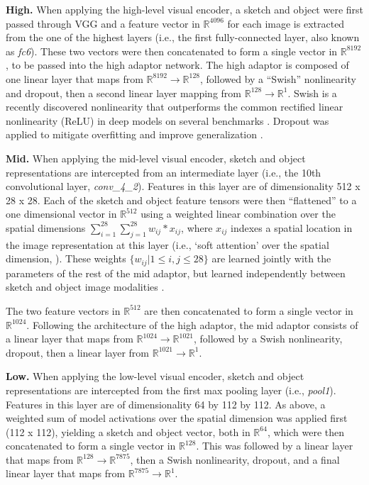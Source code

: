 \documentclass{svjour3}
\begin{document}
\textbf{High.} When applying the high-level visual encoder, a sketch and object were first passed through VGG and a feature vector in $\mathbb{R}^{4096}$ for each image is extracted from the one of the highest layers (i.e., the first fully-connected layer, also known as \textit{fc6}). 
These two vectors were then concatenated to form a single vector in $\mathbb{R}^{8192}$, to be passed into the high adaptor network. 
The high adaptor is composed of one linear layer that maps from $\mathbb{R}^{8192} \rightarrow \mathbb{R}^{128}$, followed by a ``Swish'' nonlinearity \citep*{ramachandran2018searching} and dropout, then a second linear layer mapping from $\mathbb{R}^{128} \rightarrow \mathbb{R}^{1}$.
Swish is a recently discovered nonlinearity that outperforms the common rectified linear nonlinearity (ReLU) in deep models on several benchmarks \citep*{ramachandran2018searching}.
Dropout was applied to mitigate overfitting and improve generalization \citep*{hinton2012improving,gal2015dropout}.

\textbf{Mid.} When applying the mid-level visual encoder, sketch and object representations are intercepted from an intermediate layer (i.e., the 10th convolutional layer, \textit{conv\_4\_2}).
Features in this layer are of dimensionality 512 x 28 x 28.
Each of the sketch and object feature tensors were then ``flattened'' to a one dimensional vector in $\mathbb{R}^{512}$ using a weighted linear combination over the spatial dimensions $\sum_{i=1}^{28}\sum_{j=1}^{28} w_{ij} * x_{ij}$, where $x_{ij}$ indexes a spatial location in the image representation at this layer (i.e., `soft attention' over the spatial dimension, \citep*{xu2015show}). 
These weights $\{w_{ij}|1\leq i,j \leq 28\}$ are learned jointly with the parameters of the rest of the mid adaptor, but learned independently between sketch and object image modalities \citep*{xu2015show}. 

The two feature vectors in $\mathbb{R}^{512}$ are then concatenated to form a single vector in $\mathbb{R}^{1024}$.
Following the architecture of the high adaptor, the mid adaptor consists of a linear layer that maps from $\mathbb{R}^{1024} \rightarrow \mathbb{R}^{1021}$, followed by a Swish nonlinearity, dropout, then a linear layer from $\mathbb{R}^{1021} \rightarrow \mathbb{R}^{1}$. 

\textbf{Low.} When applying the low-level visual encoder, sketch and object representations are intercepted from the first max pooling layer (i.e., \textit{pool1}).
Features in this layer are of dimensionality 64 by 112 by 112. 
As above, a weighted sum of model activations over the spatial dimension was applied first (112 x 112), yielding a sketch and object vector, both in $\mathbb{R}^{64}$, which were then concatenated to form a single vector in $\mathbb{R}^{128}$. 
This was followed by a linear layer that maps from $\mathbb{R}^{128} \rightarrow \mathbb{R}^{7875}$, then a Swish nonlinearity, dropout, and a final linear layer that maps from $\mathbb{R}^{7875} \rightarrow \mathbb{R}^{1}$. 
\end{document}
